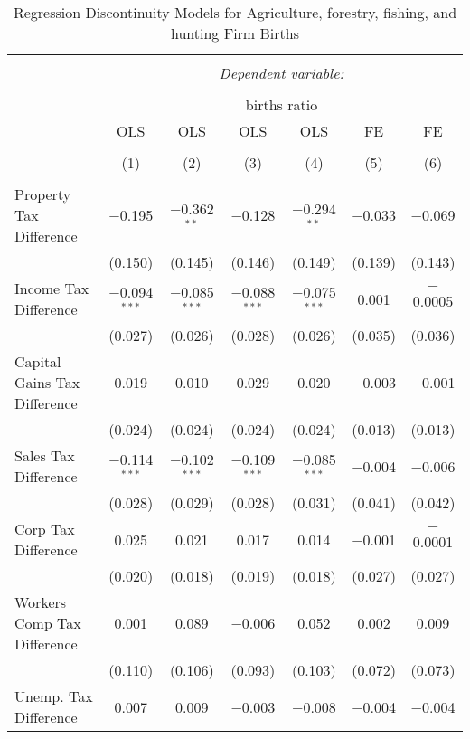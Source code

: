 
\begin{table}[!htbp] \centering 
  \caption{Regression Discontinuity Models for  Agriculture, forestry, fishing, and hunting Firm Births} 
  \label{11rd} 
\footnotesize 
\begin{tabular}{@{\extracolsep{5pt}}lcccccc} 
\\[-1.8ex]\hline 
\hline \\[-1.8ex] 
 & \multicolumn{6}{c}{\textit{Dependent variable:}} \\ 
\cline{2-7} 
\\[-1.8ex] & \multicolumn{6}{c}{births ratio} \\ 
 & OLS & OLS & OLS & OLS & FE & FE \\ 
\\[-1.8ex] & (1) & (2) & (3) & (4) & (5) & (6)\\ 
\hline \\[-1.8ex] 
 Property Tax Difference & $-$0.195 & $-$0.362$^{**}$ & $-$0.128 & $-$0.294$^{**}$ & $-$0.033 & $-$0.069 \\ 
  & (0.150) & (0.145) & (0.146) & (0.149) & (0.139) & (0.143) \\ 
  Income Tax Difference & $-$0.094$^{***}$ & $-$0.085$^{***}$ & $-$0.088$^{***}$ & $-$0.075$^{***}$ & 0.001 & $-$0.0005 \\ 
  & (0.027) & (0.026) & (0.028) & (0.026) & (0.035) & (0.036) \\ 
  Capital Gains Tax Difference & 0.019 & 0.010 & 0.029 & 0.020 & $-$0.003 & $-$0.001 \\ 
  & (0.024) & (0.024) & (0.024) & (0.024) & (0.013) & (0.013) \\ 
  Sales Tax Difference & $-$0.114$^{***}$ & $-$0.102$^{***}$ & $-$0.109$^{***}$ & $-$0.085$^{***}$ & $-$0.004 & $-$0.006 \\ 
  & (0.028) & (0.029) & (0.028) & (0.031) & (0.041) & (0.042) \\ 
  Corp Tax Difference & 0.025 & 0.021 & 0.017 & 0.014 & $-$0.001 & $-$0.0001 \\ 
  & (0.020) & (0.018) & (0.019) & (0.018) & (0.027) & (0.027) \\ 
  Workers Comp Tax Difference & 0.001 & 0.089 & $-$0.006 & 0.052 & 0.002 & 0.009 \\ 
  & (0.110) & (0.106) & (0.093) & (0.103) & (0.072) & (0.073) \\ 
  Unemp. Tax Difference & 0.007 & 0.009 & $-$0.003 & $-$0.008 & $-$0.004 & $-$0.004 \\ 

\end{tabular}
\end{table}
